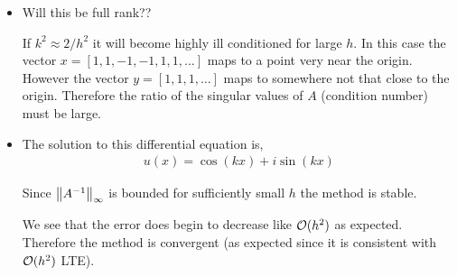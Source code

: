 \documentclass[10pt]{article}
\begin{document}
\begin{solution}[Solution]
\begin{itemize}
\item Will this be full rank??


If \( k^2 \approx 2/h^2 \) it will become highly ill conditioned for large \( h \). In this case the vector \( x = [1,1,-1,-1,1,1,\ldots] \) maps to a point very near the origin. However the vector \( y=[1,1,1,\ldots] \) maps to somewhere not that close to the origin. Therefore the ratio of the singular values of \( A \) (condition number) must be large.


\item The solution to this differential equation is,
\begin{align*}
    u(x) = \cos(k x) + i\sin(k x)
\end{align*}

Since \( \left\lVert A^{-1}\right\rVert_\infty \) is bounded for sufficiently small \( h \) the method is stable.

We see that the error does begin to decrease like \( \mathcal{O}(h^2) \) as expected. Therefore the method is convergent (as expected since it is consistent with \( \mathcal{O}(h^2) \) LTE).


\end{itemize}
\end{solution}
\end{document}
